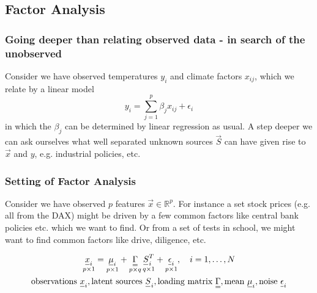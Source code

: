 
\subsection{Factor Analysis}
\subsubsection{Going deeper than relating observed data - in search of the unobserved}
Consider we have observed temperatures $y_i$ and climate factors $x_{ij}$, which we relate
by a linear model
\begin{equation}
    y_i = \sum_{j=1}^{p} \beta_j x_{ij} + \epsilon_i
\end{equation}
in which the $\beta_j$ can be determined by linear regression as usual.
A step deeper we can ask ourselves what well separated unknown sources
$\vec{S}$ can have given rise to $\vec{x}$ and $y$, e.g. industrial policies, etc.

\subsubsection{Setting of Factor Analysis}
Consider we have observed $p$ features $\vec{x} \in \mathbb{R}^{p}$.
For instance a set stock prices (e.g. all from the DAX) might be driven by a few common factors
like central bank policies etc. which we want to find. Or from a set of tests in school, we might want
to find common factors like drive, diligence, etc.

\begin{equation}
    \begin{gathered}
        \underset{p\times 1}{\vec{x}_i} = \underset{p \times 1}{\vec{\mu}_i} + \underset{p \times q}{\mat{\Gamma}} \, \underset{q \times 1}{\vec{S}_i^T} + \underset{p \times 1}{\vec{\epsilon}_i}, \quad i = 1,\dots,N \\
        \text{observations } \vec{x}_i, \text{latent sources } \vec{S}_i, \text{loading matrix } \mat{\Gamma}, \text{mean } \vec{\mu}_i, \text{noise } \vec{\epsilon}_i
    \end{gathered}
\end{equation}


